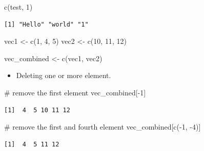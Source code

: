 \documentclass[
  letterpaper,
  DIV=11,
  numbers=noendperiod]{scrreprt}
\newenvironment{Shaded}{\begin{snugshade}}{\end{snugshade}}
\newcommand{\CommentTok}[1]{\textcolor[rgb]{0.37,0.37,0.37}{#1}}
\newcommand{\DecValTok}[1]{\textcolor[rgb]{0.68,0.00,0.00}{#1}}
\newcommand{\FunctionTok}[1]{\textcolor[rgb]{0.28,0.35,0.67}{#1}}
\newcommand{\NormalTok}[1]{\textcolor[rgb]{0.00,0.23,0.31}{#1}}
\newcommand{\OtherTok}[1]{\textcolor[rgb]{0.00,0.23,0.31}{#1}}
\newcommand{\SpecialCharTok}[1]{\textcolor[rgb]{0.37,0.37,0.37}{#1}}
\providecommand{\tightlist}{%
  \setlength{\itemsep}{0pt}\setlength{\parskip}{0pt}}
\begin{document}
\begin{Shaded}
\begin{Highlighting}[]
\FunctionTok{c}\NormalTok{(test, }\DecValTok{1}\NormalTok{)}
\end{Highlighting}
\end{Shaded}

\begin{verbatim}
[1] "Hello" "world" "1"    
\end{verbatim}

\begin{Shaded}
\begin{Highlighting}[]
\NormalTok{vec1 }\OtherTok{\textless{}{-}} \FunctionTok{c}\NormalTok{(}\DecValTok{1}\NormalTok{, }\DecValTok{4}\NormalTok{, }\DecValTok{5}\NormalTok{)}
\NormalTok{vec2 }\OtherTok{\textless{}{-}} \FunctionTok{c}\NormalTok{(}\DecValTok{10}\NormalTok{, }\DecValTok{11}\NormalTok{, }\DecValTok{12}\NormalTok{)}

\NormalTok{vec\_combined }\OtherTok{\textless{}{-}} \FunctionTok{c}\NormalTok{(vec1, vec2)}
\end{Highlighting}
\end{Shaded}

\begin{itemize}
\tightlist
\item
  Deleting one or more element.
\end{itemize}

\begin{Shaded}
\begin{Highlighting}[]
\CommentTok{\# remove the first element}
\NormalTok{vec\_combined[}\SpecialCharTok{{-}}\DecValTok{1}\NormalTok{]}
\end{Highlighting}
\end{Shaded}

\begin{verbatim}
[1]  4  5 10 11 12
\end{verbatim}

\begin{Shaded}
\begin{Highlighting}[]
\CommentTok{\# remove the first and fourth element}
\NormalTok{vec\_combined[}\FunctionTok{c}\NormalTok{(}\SpecialCharTok{{-}}\DecValTok{1}\NormalTok{, }\SpecialCharTok{{-}}\DecValTok{4}\NormalTok{)]}
\end{Highlighting}
\end{Shaded}

\begin{verbatim}
[1]  4  5 11 12
\end{verbatim}
\end{document}
